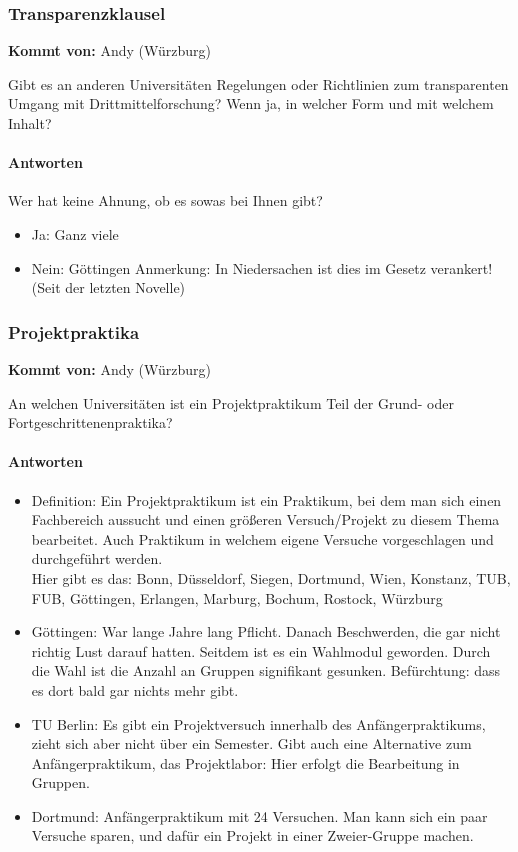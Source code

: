     \subsubsection*{Transparenzklausel}
      \textbf{Kommt von:} Andy (Würzburg)

      Gibt es an anderen Universitäten Regelungen oder Richtlinien zum transparenten Umgang mit Drittmittelforschung? Wenn ja, in welcher Form und mit welchem Inhalt?

      \paragraph{Antworten}
        Wer hat keine Ahnung, ob es sowas bei Ihnen gibt?
        \begin{itemize}
          \item Ja: Ganz viele
          \item Nein: Göttingen
          Anmerkung: In Niedersachen ist dies im Gesetz verankert! (Seit der letzten Novelle)
        \end{itemize}

    \subsubsection*{Projektpraktika}
      \textbf{Kommt von:} Andy (Würzburg)

      An welchen Universitäten ist ein Projektpraktikum Teil der Grund- oder Fortgeschrittenenpraktika?

      \paragraph{Antworten}
        \begin{itemize}
          \item Definition: Ein Projektpraktikum ist ein Praktikum, bei dem man sich einen Fachbereich aussucht und einen größeren Versuch/Projekt zu diesem Thema bearbeitet. Auch Praktikum in welchem eigene Versuche vorgeschlagen und durchgeführt werden. \\
          Hier gibt es das:
          Bonn, Düsseldorf, Siegen, Dortmund, Wien, Konstanz, TUB, FUB, Göttingen, Erlangen, Marburg, Bochum, Rostock, Würzburg
          \item Göttingen: War lange Jahre lang Pflicht. Danach Beschwerden, die gar nicht richtig Lust darauf hatten. Seitdem ist es ein Wahlmodul geworden. Durch die Wahl ist die Anzahl an Gruppen signifikant gesunken. Befürchtung: dass es dort bald gar nichts mehr gibt.
          \item TU Berlin: Es gibt ein Projektversuch innerhalb des Anfängerpraktikums, zieht sich aber nicht über ein Semester. Gibt auch eine Alternative zum Anfängerpraktikum, das Projektlabor: Hier erfolgt die Bearbeitung in Gruppen.
          \item Dortmund: Anfängerpraktikum mit 24 Versuchen. Man kann sich ein paar Versuche sparen, und dafür ein Projekt in einer Zweier-Gruppe machen.

        \end{itemize}

